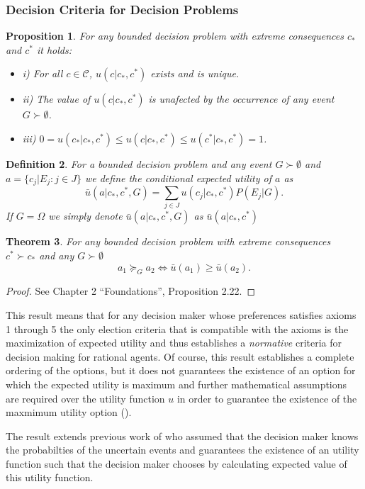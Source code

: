 \documentclass[11pt]{article}
\theoremstyle{plain}
\newtheorem{teo}{Theorem}
\newtheorem{prop}[teo]{Proposition}
\newtheorem{defi}[teo]{Definition}
\begin{document}
	\subsubsection{Decision Criteria for Decision Problems}
	\begin{prop}
	For any bounded decision problem with extreme consequences $c_\ast$ and $c^\ast$ it holds:
	\begin{itemize}
	\item i) For all $c \in \mathcal{C}$, $u(c | c_\ast, c^\ast)$ exists and is unique.
	\item ii) The value of $u(c | c_\ast, c^\ast)$ is unafected by the occurrence of any event $G \succ \emptyset$.
	\item iii) $0 = u(c_\ast | c_\ast, c^\ast) \leq u(c | c_\ast, c^\ast) \leq u(c^\ast | c_\ast, c^\ast) = 1$.
	\end{itemize}
	\end{prop}
	\begin{defi}
	For a bounded decision problem and any event $G \succ \emptyset$ and $a = \{ c_j | E_j : j \in J \}$ we define the conditional expected utility of $a$ as
	\[ \bar{u}(a | c_\ast, c^\ast, G) = \sum_{j \in J} u(c_j | c_\ast, c^\ast)P(E_j | G). \]
	If $G = \Omega$ we simply denote $\bar{u}(a | c_\ast, c^\ast, G)$ as $\bar{u}(a | c_\ast, c^\ast)$
	\end{defi}
	\begin{teo}
	For any bounded decision problem with extreme consequences $c^\ast \succ c_\ast$ and any $G \succ \emptyset$
	\[ a_1 \succeq_G a_2 \Leftrightarrow \bar{u}(a_1) \geq \bar{u}(a_2). \]
	\end{teo}
	\begin{proof}
	See \cite{bernardo2000bayesian} Chapter 2 “Foundations”, Proposition 2.22.
	\end{proof}
	This result means that for any decision maker whose preferences satisfies axioms 1 through 5 the only election criteria that is compatible with the axioms is the maximization of expected utility and thus establishes a \textit{normative} criteria for decision making for rational agents. Of course, this result establishes a complete ordering of the options, but it does not guarantees the existence of an option for which the expected utility is maximum and further mathematical assumptions are required over the utility function $u$ in order to guarantee the existence of the maxmimum utility option (\cite{bernardo2000bayesian}).
	
	The result extends previous work of \cite{von1944theory} who assumed that the decision maker knows the probabilties of the uncertain events and guarantees the existence of an utility function such that the decision maker chooses by calculating expected value of this utility function.
\end{document}
